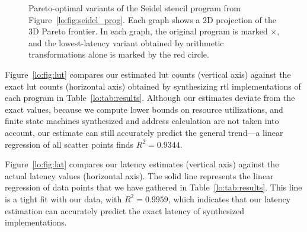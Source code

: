 \begin{figure*}[t]
    \caption{%
        Pareto-optimal variants of the Seidel stencil program from
        Figure~\ref{lo:fig:seidel_prog}. Each graph shows a 2D projection
        of the 3D Pareto frontier. In each graph, the original program is
        marked $\times$, and the lowest-latency variant obtained by arithmetic
        transformations alone is marked by the red circle.}
    \label{lo:fig:seidel}
\end{figure*}

Figure~\ref{lo:fig:lut} compares our estimated \gls{lut} counts (vertical axis)
against the exact \gls{lut} counts (horizontal axis) obtained by synthesizing
\gls{rtl} implementations of each program in Table~\ref{lo:tab:results}.
Although our estimates deviate from the exact values, because we compute
lower bounds on resource utilizations, and finite state machines synthesized
and address calculation are not taken into account, our estimate can still
accurately predict the general trend---a linear regression of all scatter
points finds $R^2 = 0.9344$.

Figure~\ref{lo:fig:lat} compares our latency estimates (vertical axis)
against the actual latency values (horizontal axis). The solid line
represents the linear regression of data points that we have gathered in
Table~\ref{lo:tab:results}. This line is a tight fit with our data, with $R^2 =
0.9959$, which indicates that our latency estimation can accurately predict the
exact latency of synthesized implementations.

